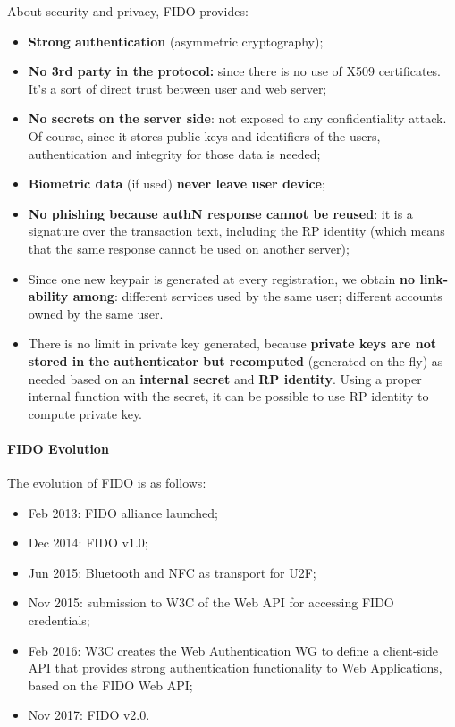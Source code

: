 About security and privacy, FIDO provides:
\begin{itemize}
  \item \textbf{Strong authentication} (asymmetric cryptography);
  \item \textbf{No 3rd party in the protocol:} since there is no use of X509 certificates. It's a sort of direct trust between user and web server;
  \item \textbf{No secrets on the server side}: not exposed to any confidentiality attack. Of course, since it stores public keys and identifiers of the users, authentication and integrity for those data is needed;
  \item \textbf{Biometric data} (if used) \textbf{never leave user device};
  \item \textbf{No phishing because authN response cannot be reused}: it is a signature over the transaction text, including the RP identity (which means that the same response cannot be used on another server);
  \item Since one new keypair is generated at every registration, we obtain \textbf{no link-ability among}: different services used by the same user; different accounts owned by the same user.
  \item There is no limit in private key generated, because \textbf{private keys are not stored in the authenticator but recomputed} (generated on-the-fly) as needed based on an \textbf{internal secret} and \textbf{RP identity}. Using a proper internal function with the secret, it can be possible to use RP identity to compute private key.
\end{itemize}

\paragraph{FIDO Evolution}

The evolution of FIDO is as follows:
\begin{itemize}
  \item Feb 2013: FIDO alliance launched;
  \item Dec 2014: FIDO v1.0;
  \item Jun 2015: Bluetooth and NFC as transport for U2F;
  \item Nov 2015: submission to W3C of the Web API for accessing FIDO credentials;
  \item Feb 2016: W3C creates the Web Authentication WG to define a client-side API that provides strong authentication functionality to Web Applications, based on the FIDO Web API;
  \item Nov 2017: FIDO v2.0.
\end{itemize}

